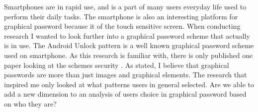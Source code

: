   Smartphones are in rapid use, and is a part of many users everyday life used to perform their daily tasks. The smartphone is also an interesting platform for graphical password because it of the touch sensitive screen. When conducting research I wanted to look further into a graphical password scheme that actually is in use. The Android Unlock pattern is a well known graphical password scheme used on smartphone. As this research is familiar with, there is only published one paper looking at the schemes security \cite{Uellenbeck}. As stated, I believe that graphical passwords are more than just images and graphical elements. The research that inspired me only looked at what patterns users in general selected. Are we able to add a new dimension to an analysis of users choice in graphical password based on who they are? 


